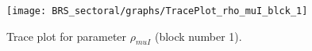 \begin{figure}[H]
\centering
  \texttt{[image: BRS\_sectoral/graphs/TracePlot\_rho\_muI\_blck\_1]}\\
    \caption{Trace plot for parameter ${\rho_{muI}}$ (block number 1).}
\end{figure}
